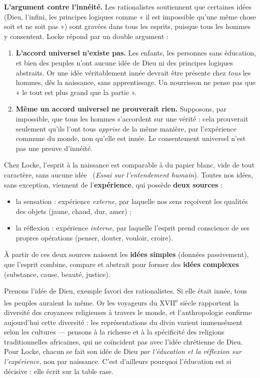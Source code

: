 \documentclass[11pt]{article}
\newcommand{\cle}[1]{{\popxbold\color{popdark}#1}}
\begin{document}
\textbf{L'argument contre l'innéité.} Les rationalistes soutiennent que certaines idées (Dieu, l'infini, les principes logiques comme « il est impossible qu'une même chose soit et ne soit pas ») sont gravées dans tous les esprits, puisque tous les hommes y consentent. Locke répond par un double argument :

\begin{enumerate}
\item \textbf{L'accord universel n'existe pas.} Les enfants, les personnes sans éducation, et bien des peuples n'ont aucune idée de Dieu ni des principes logiques abstraits. Or une idée véritablement innée devrait être présente chez \emph{tous} les hommes, dès la naissance, sans apprentissage. Un nourrisson ne pense pas que « le tout est plus grand que la partie ».
\item \textbf{Même un accord universel ne prouverait rien.} Supposons, par impossible, que tous les hommes s'accordent sur une vérité : cela prouverait seulement qu'ils l'ont tous \emph{apprise} de la même manière, par l'expérience commune du monde, non qu'elle est innée. Le consentement universel n'est pas une preuve d'innéité.
\end{enumerate}

\begin{propriete}
Chez Locke, l'esprit à la naissance est comparable à \guillemotleft du papier blanc, vide de tout caractère, sans aucune idée \guillemotright\ (\emph{Essai sur l'entendement humain}). Toutes nos idées, sans exception, viennent de l'\textbf{expérience}, qui possède \textbf{deux sources} :
\begin{itemize}
\item la \cle{sensation} : expérience \emph{externe}, par laquelle nos sens reçoivent les qualités des objets (jaune, chaud, dur, amer) ;
\item la \cle{réflexion} : expérience \emph{interne}, par laquelle l'esprit prend conscience de ses propres opérations (penser, douter, vouloir, croire).
\end{itemize}
À partir de ces deux sources naissent les \textbf{idées simples} (données passivement), que l'esprit combine, compare et abstrait pour former des \textbf{idées complexes} (substance, cause, beauté, justice).
\end{propriete}

\begin{exemplebox}
Prenons l'idée de Dieu, exemple favori des rationalistes. Si elle était innée, tous les peuples auraient la même. Or les voyageurs du XVII\textsuperscript{e} siècle rapportent la diversité des croyances religieuses à travers le monde, et l'anthropologie confirme aujourd'hui cette diversité : les représentations du divin varient immensément selon les cultures — pensons à la richesse et à la spécificité des religions traditionnelles africaines, qui ne coïncident pas avec l'idée chrétienne de Dieu. Pour Locke, chacun se fait son idée de Dieu \emph{par l'éducation et la réflexion sur l'expérience}, non par naissance. C'est d'ailleurs pourquoi l'éducation est si décisive : elle écrit sur la table rase.
\end{exemplebox}
\end{document}
